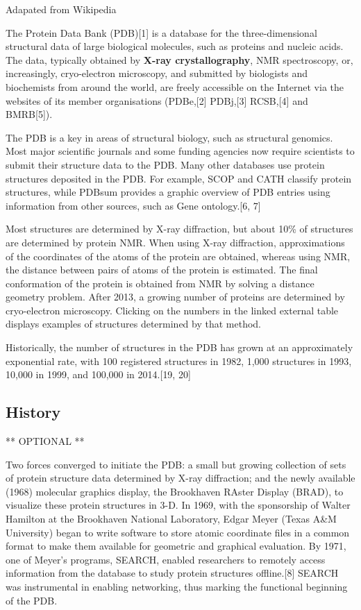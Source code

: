 \documentclass[
]{book}
\begin{document}
Adapated from Wikipedia

The Protein Data Bank (PDB){[}1{]} is a database for the three-dimensional structural data of large biological molecules, such as proteins and nucleic acids. The data, typically obtained by \textbf{X-ray crystallography}, NMR spectroscopy, or, increasingly, cryo-electron microscopy, and submitted by biologists and biochemists from around the world, are freely accessible on the Internet via the websites of its member organisations (PDBe,{[}2{]} PDBj,{[}3{]} RCSB,{[}4{]} and BMRB{[}5{]}).

The PDB is a key in areas of structural biology, such as structural genomics. Most major scientific journals and some funding agencies now require scientists to submit their structure data to the PDB. Many other databases use protein structures deposited in the PDB. For example, SCOP and CATH classify protein structures, while PDBsum provides a graphic overview of PDB entries using information from other sources, such as Gene ontology.{[}6, 7{]}

Most structures are determined by X-ray diffraction, but about 10\% of structures are determined by protein NMR. When using X-ray diffraction, approximations of the coordinates of the atoms of the protein are obtained, whereas using NMR, the distance between pairs of atoms of the protein is estimated. The final conformation of the protein is obtained from NMR by solving a distance geometry problem. After 2013, a growing number of proteins are determined by cryo-electron microscopy. Clicking on the numbers in the linked external table displays examples of structures determined by that method.

Historically, the number of structures in the PDB has grown at an approximately exponential rate, with 100 registered structures in 1982, 1,000 structures in 1993, 10,000 in 1999, and 100,000 in 2014.{[}19, 20{]}

\hypertarget{history}{%
\subsection{History}\label{history}}

** OPTIONAL **

Two forces converged to initiate the PDB: a small but growing collection of sets of protein structure data determined by X-ray diffraction; and the newly available (1968) molecular graphics display, the Brookhaven RAster Display (BRAD), to visualize these protein structures in 3-D. In 1969, with the sponsorship of Walter Hamilton at the Brookhaven National Laboratory, Edgar Meyer (Texas A\&M University) began to write software to store atomic coordinate files in a common format to make them available for geometric and graphical evaluation. By 1971, one of Meyer's programs, SEARCH, enabled researchers to remotely access information from the database to study protein structures offline.{[}8{]} SEARCH was instrumental in enabling networking, thus marking the functional beginning of the PDB.
\end{document}
